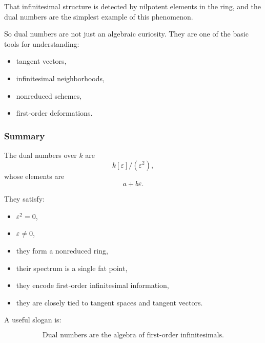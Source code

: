 \documentclass[12pt,a4paper]{article}
\theoremstyle{plain}
\theoremstyle{definition}      %
\begin{document}
	That infinitesimal structure is detected by nilpotent elements in the ring, and the dual numbers are the simplest example of this phenomenon.
	
	So dual numbers are not just an algebraic curiosity. They are one of the basic tools for understanding:
	
	\begin{itemize}
		\item tangent vectors,
		\item infinitesimal neighborhoods,
		\item nonreduced schemes,
		\item first-order deformations.
	\end{itemize}
	
	\subsubsection*{Summary}
	
	The dual numbers over \(k\) are
	\[
	k[\varepsilon]/(\varepsilon^2),
	\]
	whose elements are
	\[
	a+b\varepsilon.
	\]
	
	They satisfy:
	\begin{itemize}
		\item \(\varepsilon^2=0\),
		\item \(\varepsilon\neq 0\),
		\item they form a nonreduced ring,
		\item their spectrum is a single fat point,
		\item they encode first-order infinitesimal information,
		\item they are closely tied to tangent spaces and tangent vectors.
	\end{itemize}
	
	A useful slogan is:
	
	\[
	\boxed{
		\text{Dual numbers are the algebra of first-order infinitesimals.}
	}
	\]
	
	
\end{document}
